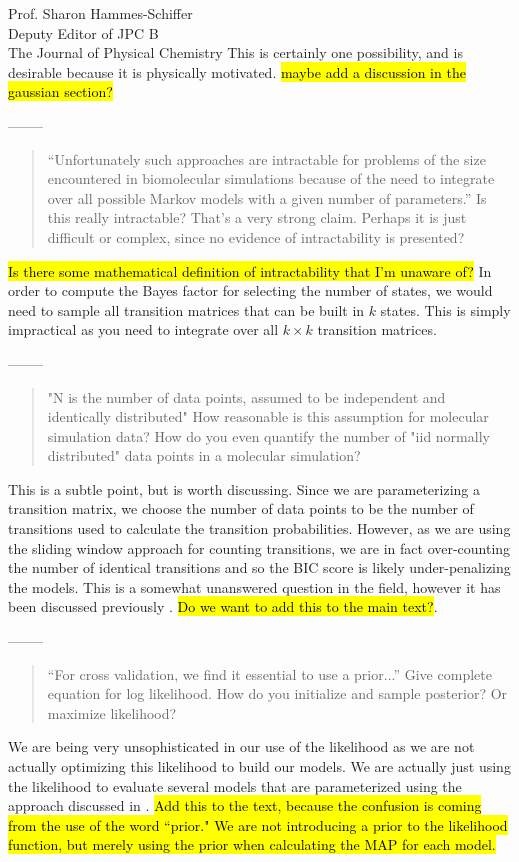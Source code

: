 \documentclass{letter}
\newcommand{\separate}{\begin{center}--------\end{center}}
\begin{document}
\begin{letter}{Prof. Sharon Hammes-Schiffer \\ Deputy Editor of JPC B \\ The Journal of Physical Chemistry}
This is certainly one possibility, and is desirable because it is physically motivated. \hl{maybe add a discussion in the gaussian section?}
\separate
\begin{quote}
``Unfortunately such approaches are intractable for problems of the size encountered in biomolecular simulations because of the need to integrate over all possible Markov models with a given number of parameters.''  Is this really intractable?  That's a very strong claim.  Perhaps it is just difficult or complex, since no evidence of intractability is presented?
\end{quote}
\hl{Is there some mathematical definition of intractability that I'm unaware of?}
In order to compute the Bayes factor for selecting the number of states, we would need to sample all transition matrices that can be built in $k$ states. This is simply impractical as you need to integrate over all $k \times k$ transition matrices.  

\separate
\begin{quote}
"N is the number of data points, assumed to be independent and identically distributed"  How reasonable is this assumption for molecular simulation data?  How do you even quantify the number of "iid normally distributed" data points in a molecular simulation?
\end{quote}

This is a subtle point, but is worth discussing. Since we are parameterizing a transition matrix, we choose the number of data points to be the number of transitions used to calculate the transition probabilities. However, as we are using the sliding window approach for counting transitions, we are in fact over-counting the number of identical transitions and so the BIC score is likely under-penalizing the models. This is a somewhat unanswered question in the field, however it has been discussed previously \cite{noe_sliding_window}. \hl{Do we want to add this to the main text?}.

\separate
\begin{quote}
``For cross validation, we find it essential to use a prior...''  Give complete equation for log likelihood.  How do you initialize and sample posterior?  Or maximize likelihood?
\end{quote}

We are being very unsophisticated in our use of the likelihood as we are not actually optimizing this likelihood to build our models. We are actually just using the likelihood to evaluate several models that are parameterized using the approach discussed in \cite{Beauchamp_msmb2}. \hl{Add this to the text, because the confusion is coming from the use of the word ``prior." We are not introducing a prior to the likelihood function, but merely using the prior when calculating the MAP for each model.}


\end{letter}
\end{document}
